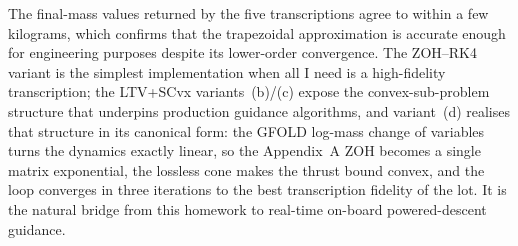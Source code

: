 \documentclass[../main.tex]{subfiles}
\begin{document}
The final-mass values returned by the five transcriptions agree to within a few kilograms, which confirms that the trapezoidal approximation is accurate enough for engineering purposes despite its lower-order convergence. The ZOH--RK4 variant is the simplest implementation when all I need is a high-fidelity transcription; the LTV+SCvx variants~(b)/(c) expose the convex-sub-problem structure that underpins production guidance algorithms, and variant~(d) realises that structure in its canonical form: the GFOLD log-mass change of variables turns the dynamics exactly linear, so the Appendix~A ZOH becomes a single matrix exponential, the lossless cone makes the thrust bound convex, and the loop converges in three iterations to the best transcription fidelity of the lot. It is the natural bridge from this homework to real-time on-board powered-descent guidance.
\end{document}
